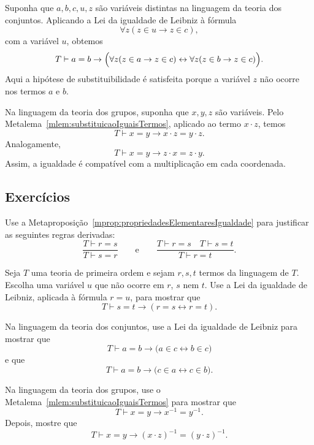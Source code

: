 \begin{example}
    Suponha que $a,b,c,u,z$ são variáveis distintas na linguagem da teoria dos conjuntos.
    Aplicando a Lei da igualdade de Leibniz à fórmula
    \[
        \forall z(z\in u\rightarrow z\in c),
    \]
    com a variável $u$, obtemos
    \[
        T\vdash
        a=b\rightarrow
        \Bigl(
        \forall z(z\in a\rightarrow z\in c)
        \leftrightarrow
        \forall z(z\in b\rightarrow z\in c)
        \Bigr).
    \]
    Aqui a hipótese de substituibilidade é satisfeita porque a variável $z$ não ocorre nos termos $a$ e $b$.
\end{example}

\begin{example}
    Na linguagem da teoria dos grupos, suponha que $x,y,z$ são variáveis.
    Pelo Metalema~\ref{mlem:substituicaoIguaisTermos}, aplicado ao termo $x\cdot z$, temos
    \[
        T\vdash x=y\rightarrow x\cdot z=y\cdot z.
    \]
    Analogamente,
    \[
        T\vdash x=y\rightarrow z\cdot x=z\cdot y.
    \]
    Assim, a igualdade é compatível com a multiplicação em cada coordenada.
\end{example}

\subsection*{Exercícios}

\begin{exercise}
    Use a Metaproposição~\ref{mprop:propriedadesElementaresIgualdade} para justificar as seguintes regras derivadas:
    \[
        \frac{T\vdash r=s}{T\vdash s=r}
        \qquad\text{e}\qquad
        \frac{T\vdash r=s \quad T\vdash s=t}{T\vdash r=t}.
    \]
\end{exercise}

\begin{exercise}
    Seja $T$ uma teoria de primeira ordem e sejam $r,s,t$ termos da linguagem de $T$.
    Escolha uma variável $u$ que não ocorre em $r$, $s$ nem $t$.
    Use a Lei da igualdade de Leibniz, aplicada à fórmula $r=u$, para mostrar que
    \[
        T\vdash s=t\rightarrow(r=s\leftrightarrow r=t).
    \]
\end{exercise}

\begin{exercise}
    Na linguagem da teoria dos conjuntos, use a Lei da igualdade de Leibniz para mostrar que
    \[
        T\vdash a=b\rightarrow
        \bigl(a\in c\leftrightarrow b\in c\bigr)
    \]
    e que
    \[
        T\vdash a=b\rightarrow
        \bigl(c\in a\leftrightarrow c\in b\bigr).
    \]
\end{exercise}

\begin{exercise}
    Na linguagem da teoria dos grupos, use o Metalema~\ref{mlem:substituicaoIguaisTermos} para mostrar que
    \[
        T\vdash x=y\rightarrow x^{-1}=y^{-1}.
    \]
    Depois, mostre que
    \[
        T\vdash x=y\rightarrow (x\cdot z)^{-1}=(y\cdot z)^{-1}.
    \]
\end{exercise}
